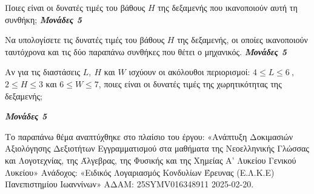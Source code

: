 \documentclass[11pt,a4paper,twoside]{book}
\newcommand{\monades}[1]{
\hspace*{\fill}
\textbf{\textit{\textcolor{maincolor}{Μονάδες #1}}}}
\begin{document}
\begin{alist}
{
}
Ποιες είναι οι δυνατές τιμές του βάθους $Η$ της δεξαμενής που ικανοποιούν αυτή τη συνθήκη;\monades{5}
\item Να υπολογίσετε τις δυνατές τιμές του βάθους $Η$ της δεξαμενής, οι οποίες ικανοποιούν ταυτόχρονα και τις δύο παραπάνω συνθήκες που θέτει ο μηχανικός.\monades{5}
\item Αν για τις διαστάσεις $L,\ H$ και $W$ ισχύουν οι ακόλουθοι περιορισμοί: $4 \leq L \leq 6\ ,$ $2 \leq Η \leq 3$ και $6 \leq W \leq 7$, ποιες είναι οι δυνατές τιμές της χωρητικότητας της δεξαμενής;
\monades{5}

{\footnotesize Το παραπάνω θέμα αναπτύχθηκε στο πλαίσιο του έργου: «Ανάπτυξη Δοκιμασιών Αξιολόγησης Δεξιοτήτων Εγγραμματισμού στα μαθήματα της Νεοελληνικής Γλώσσας και Λογοτεχνίας, της Άλγεβρας, της Φυσικής και της Χημείας Α' Λυκείου Γενικού Λυκείου» Ανάδοχος: «Ειδικός Λογαριασμός Κονδυλίων Έρευνας (Ε.Λ.Κ.Ε) Πανεπιστημίου Ιωαννίνων» ΑΔΑΜ: 25SYMV016348911 2025-02-20.}
\end{alist}
\end{document}
